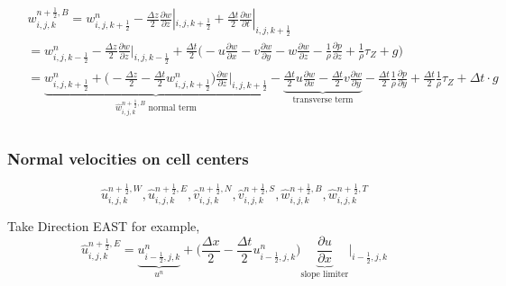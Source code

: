 \documentclass{article}
\numberwithin{equation}{subsection}
\begin{document}
\begin{align}
\begin{split}
& w_{i,j,k}^{n+\frac{1}{2},B} = w_{i,j,k+\frac{1}{2}}^n - \frac{\Delta z}{2}\frac{\partial w}{\partial z}|_{i,j,k+\frac{1}{2}} + \frac{\Delta t}{2}\frac{\partial w}{\partial t}|_{i,j,k+\frac{1}{2}}\\
&= w_{i,j,k-\frac{1}{2}}^n - \frac{\Delta z}{2} \frac{\partial w}{\partial z}|_{i,j,k-\frac{1}{2}} + \frac{\Delta t}{2} \Big( -u\frac{\partial w}{\partial x} -v\frac{\partial w}{\partial y} -w\frac{\partial w}{\partial z} - \frac{1}{\rho}\frac{\partial p}{\partial z} + \frac{1}{\rho}\tau_Z + g\Big) \\
&= \underbrace{w_{i,j,k+\frac{1}{2}}^n + \Big(-\frac{\Delta z}{2} - \frac{\Delta t}{2} w_{i,j,k+\frac{1}{2}}^n\Big)\frac{\partial w}{\partial z}|_{i,j,k+\frac{1}{2}}}_\text{$\widehat{w}_{i,j,k}^{n+\frac{1}{2},B}$ normal term} -\underbrace{\frac{\Delta t}{2}u\frac{\partial w}{\partial x} - \frac{\Delta t}{2}v\frac{\partial w}{\partial y}}_\text{transverse term} - \frac{\Delta t}{2}\frac{1}{\rho}\frac{\partial p}{\partial y} + \frac{\Delta t}{2}\frac{1}{\rho}\tau_Z+ \Delta t \cdot g \\
\end{split}
\end{align}



\subsubsection{Normal velocities on cell centers}
\begin{equation}
    \widehat{u}_{i,j,k}^{n+\frac{1}{2}, W},
\widehat{u}_{i,j,k}^{n+\frac{1}{2}, E},
\widehat{v}_{i,j,k}^{n+\frac{1}{2}, N},
\widehat{v}_{i,j,k}^{n+\frac{1}{2}, S},
\widehat{w}_{i,j,k}^{n+\frac{1}{2}, B},
\widehat{w}_{i,j,k}^{n+\frac{1}{2}, T}
\end{equation}

Take Direction EAST for example,
\begin{equation}
\widehat{u}_{i,j,k}^{n+\frac{1}{2},E} =
\underbrace{{u_{i-\frac{1}{2},j,k}^n}}_\text{$u^n$} + \Big(\frac{\Delta x}{2} - \frac{\Delta t}{2} u_{i-\frac{1}{2},j,k}^n\Big) \underbrace{\frac{\partial u}{\partial x}}_\text{slope limiter} |_{i-\frac{1}{2},j,k}
\end{equation}
\end{document}
